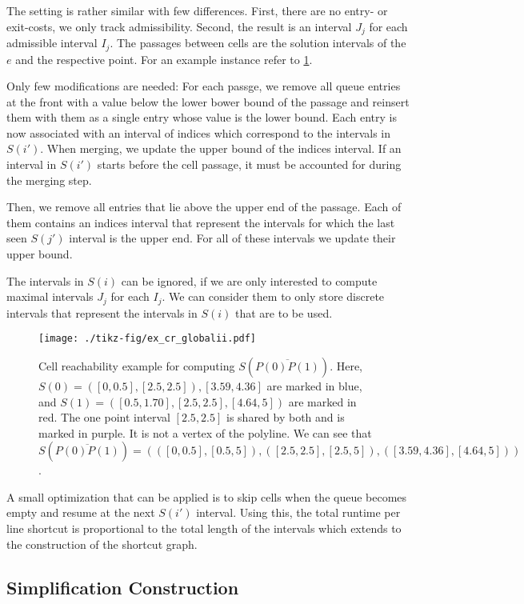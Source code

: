 The setting is rather similar with few differences. First, there are no entry- or exit-costs, we only track admissibility. Second, the result is an interval \(J_j\) for each admissible interval \(I_j\). The passages between cells are the solution intervals of the \(e\) and the respective point. For an example instance refer to \cref{fig:ex_cr_globalii}.

Only few modifications are needed: For each passge, we remove all queue entries at the front with a value below the lower bower bound of the passage and reinsert them with them as a single entry whose value is the lower bound. Each entry is now associated with an interval of indices which correspond to the intervals in \(S(i')\). When merging, we update the upper bound of the indices interval. If an interval in \(S(i')\) starts before the cell passage, it must be accounted for during the merging step.

Then, we remove all entries that lie above the upper end of the passage. Each of them contains an indices interval that represent  the intervals for which the last seen \(S(j')\) interval is the upper end. For all of these intervals we update their upper bound.

The intervals in \(S(i)\) can be ignored, if we are only interested to compute maximal intervals \(J_j\) for each \(I_j\). We can consider them to only store discrete intervals that represent the intervals in \(S(i)\) that are to be used.

\begin{figure}[htb]
  \centering
  \texttt{[image: ./tikz-fig/ex\_cr\_globalii.pdf]}
	\caption{Cell reachability example for computing \(S(\overline{P(0)P(1)})\). Here, \(S(0) = ([0, 0.5], [2.5, 2.5]), [3.59, 4.36]\) are marked in blue, and \(S(1) = ([0.5, 1.70], [2.5, 2.5], [4.64, 5])\) are marked in red. The one point interval \([2.5,2.5]\) is shared by both and is marked in purple. It is not a vertex of the polyline. We can see that \(S(\overline{P(0)P(1)}) = (([0,0.5], [0.5,5]), ([2.5,2.5],[2.5,5]), ([3.59,4.36],[4.64,5]))\).}
  \label{fig:ex_cr_globalii}
\end{figure}

A small optimization that can be applied is to skip cells when the queue becomes empty and resume at the next \(S(i')\) interval. Using this, the total runtime per line shortcut is proportional to the total length of the intervals which extends to the construction of the shortcut graph.

\subsection{Simplification Construction}













